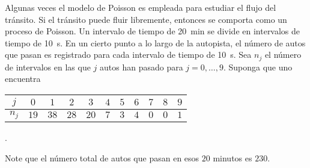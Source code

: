 \question

	Algunas veces el modelo de Poisson es empleada para estudiar el flujo del tránsito. Si el tránsito puede fluir libremente, entonces se comporta como un proceso de Poisson. Un intervalo de tiempo de \SI{20}{\minute} se divide en intervalos de tiempo de \SI{10}{\second}. En un cierto punto a lo largo de la autopista, el número de autos que pasan es registrado para cada intervalo de tiempo de \SI{10}{\second}. Sea $n_j$ el número de intervalos en las que $j$ autos han pasado para $j=0,\ldots,9$. Suponga que uno encuentra

	\centering
	\begin{tabular}{c|cccccccccc}
		$j$ 	& $0$ & $1$ & $2$ & $3$ & $4$ & $5$ & $6$ & $7$ & $8$ & $9$ \\
		\hline
		$n_{j}	$& $19$ & $38$ & $28$ & $20$ & $7$ & $3$ & $4$ & $0$ & $0$ & $1$
	\end{tabular}\quad.

	\justifying
	\noindent Note que el número total de autos que pasan en esos $20$ minutos es $230$.


